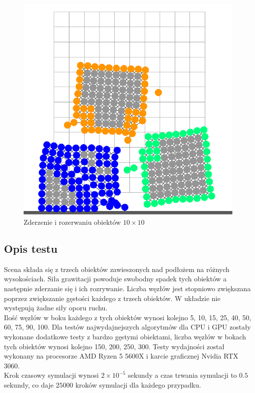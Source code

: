 \documentclass[12pt, letterpaper]{report}
\begin{document}
\begin{figure}
        \includegraphics[width=0.9\linewidth]{app_boundary_performance_10x10_02.png} 
        \caption{Zderzenie i rozerwaniu obiektów $10\times10$}
    \end{figure}
    \subsection{Opis testu}
    Scena składa się z trzech obiektów zawieszonych nad podłożem na różnych wysokościach. Siła grawitacji 
    powoduje swobodny spadek tych obiektów a następnie zderzanie się i ich rozrywanie. Liczba węzłów jest
    stopniowo zwiększana poprzez zwiększanie gęstości każdego z trzech obiektów. W układzie nie
    występują żadne siły oporu ruchu.\\
    
    Ilość węzłów w boku 
    każdego z tych obiektów wynosi kolejno 5, 10, 15, 25, 40, 50, 60, 75, 90, 100. Dla 
    testów najwydajnejszych algorytmów dla CPU i GPU zostały wykonane dodatkowe testy z 
    bardzo gęstymi obiektami, liczba węzłów w bokach tych obiektów wynosi kolejno 150, 200, 250, 300.
    Testy wydajności został wykonany na procesorze AMD Ryzen 5 5600X i
    karcie graficznej Nvidia RTX 3060. \\
    
    Krok czasowy symulacji wynosi
    $2 \times 10^{-5}$ sekundy a czas trwania symulacji to $0.5$ sekundy, co 
    daje $25000$ kroków symulacji dla każdego przypadku. \\
\end{document}
